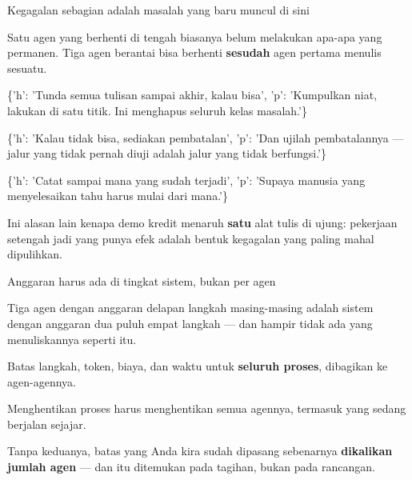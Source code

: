 \documentclass[aspectratio=169,11pt,t]{beamer}
\begin{document}
\begin{frame}[shrink=25]{Kegagalan sebagian adalah masalah yang baru muncul di sini}
{\fontsize{9.4}{12.6}\selectfont\color{fg2}Satu agen yang berhenti di tengah biasanya belum melakukan apa-apa yang permanen. Tiga agen berantai bisa berhenti \textbf{sesudah} agen pertama menulis sesuatu.\par}\vskip 4pt
\begin{isteps}
\item \{'h': 'Tunda semua tulisan sampai akhir, kalau bisa', 'p': 'Kumpulkan niat, lakukan di satu titik. Ini menghapus seluruh kelas masalah.'\}
\item \{'h': 'Kalau tidak bisa, sediakan pembatalan', 'p': 'Dan ujilah pembatalannya --- jalur yang tidak pernah diuji adalah jalur yang tidak berfungsi.'\}
\item \{'h': 'Catat sampai mana yang sudah terjadi', 'p': 'Supaya manusia yang menyelesaikan tahu harus mulai dari mana.'\}
\end{isteps}
\begin{iband}[signal]
Ini alasan lain kenapa demo kredit menaruh \textbf{satu} alat tulis di ujung: pekerjaan setengah jadi yang punya efek adalah bentuk kegagalan yang paling mahal dipulihkan.
\end{iband}
\end{frame}

\begin{frame}[shrink=25]{Anggaran harus ada di tingkat sistem, bukan per agen}
{\fontsize{9.4}{12.6}\selectfont\color{fg2}Tiga agen dengan anggaran delapan langkah masing-masing adalah sistem dengan anggaran dua puluh empat langkah --- dan hampir tidak ada yang menuliskannya seperti itu.\par}\vskip 4pt
\begin{minipage}[t]{0.494\textwidth}
\begin{icardaccent}
Batas langkah, token, biaya, dan waktu untuk \textbf{seluruh proses}, dibagikan ke agen-agennya.
\end{icardaccent}
\end{minipage}%
\hfill
\begin{minipage}[t]{0.494\textwidth}
\begin{icardaccent}
Menghentikan proses harus menghentikan semua agennya, termasuk yang sedang berjalan sejajar.
\end{icardaccent}
\end{minipage}%
\begin{iband}[signal]
Tanpa keduanya, batas yang Anda kira sudah dipasang sebenarnya \textbf{dikalikan jumlah agen} --- dan itu ditemukan pada tagihan, bukan pada rancangan.
\end{iband}
\end{frame}
\end{document}
